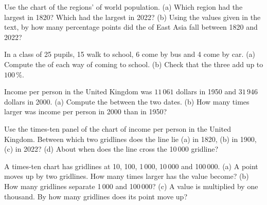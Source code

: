 \begin{exercise}[$\star$]\label{exo:g6:reading-economic-charts:3}
Use the chart of the regions'  of world population. (a) Which region had
the largest  in 1820? Which had the largest  in 2022? (b) Using the
values given in the text, by how many percentage points did the  of
East Asia fall between 1820 and 2022?
\end{exercise}

\begin{exercise}[$\star$]\label{exo:g6:reading-economic-charts:4}
In a class of 25 pupils, 15 walk to school, 6 come by bus and 4 come by car.
(a) Compute the  of each way of coming to school. (b) Check that the three
 add up to $100\,\%$.
\end{exercise}

\begin{exercise}[$\star\star$]\label{exo:g6:reading-economic-charts:5}
Income per person in the United Kingdom was $11\,061$ dollars in 1950 and
$31\,946$ dollars in 2000. (a) Compute the  between the two dates.
(b) How many times larger was income per person in 2000 than in 1950?
\end{exercise}

\begin{exercise}[$\star\star$]\label{exo:g6:reading-economic-charts:6}
Use the times-ten panel of the chart of income per person in the United
Kingdom. Between which two gridlines does the line lie (a) in 1820, (b) in
1900, (c) in 2022? (d) About when does the line cross the 10\,000 gridline?
\end{exercise}

\begin{exercise}[$\star\star$]\label{exo:g6:reading-economic-charts:7}
A times-ten chart has gridlines at 10, 100, 1\,000, 10\,000 and 100\,000.
(a) A point moves up by two gridlines. How many times larger has the value
become? (b) How many gridlines separate 1\,000 and 100\,000? (c) A value is
multiplied by one thousand. By how many gridlines does its point move up?
\end{exercise}

